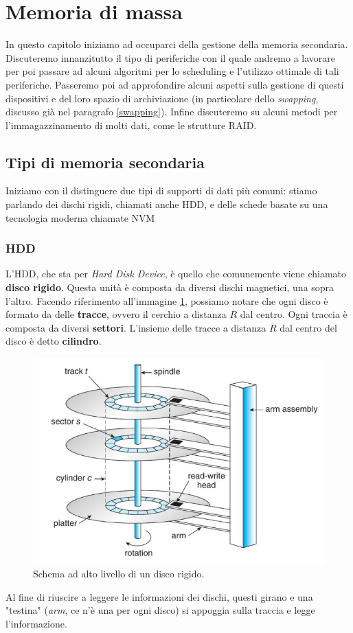 \section{Memoria di massa}\label{mass memory}
In questo capitolo iniziamo ad occuparci della gestione della memoria secondaria. Discuteremo innanzitutto il tipo di periferiche con il quale andremo a lavorare per poi passare ad alcuni algoritmi per lo scheduling e l'utilizzo ottimale di tali periferiche. Passeremo poi ad approfondire alcuni aspetti sulla gestione di questi dispositivi e del loro spazio di archiviazione (in particolare dello \textit{swapping}, discusso già nel paragrafo \ref{swapping}). Infine discuteremo su alcuni metodi per l'immagazzinamento di molti dati, come le strutture RAID.

\subsection{Tipi di memoria secondaria}
Iniziamo con il distinguere due tipi di supporti di dati più comuni: stiamo parlando dei dischi rigidi, chiamati anche HDD, e delle schede basate su una tecnologia moderna chiamate NVM

\subsubsection{HDD}\label{seek}
L'HDD, che sta per \textit{Hard Disk Device}, è quello che comunemente viene chiamato \textbf{disco rigido}. Questa unità è composta da diversi dischi magnetici, una sopra l'altro. Facendo riferimento all'immagine \ref{fig:HDD}, possiamo notare che ogni disco è formato da delle \textbf{tracce}, ovvero il cerchio a distanza $\overline{R}$ dal centro. Ogni traccia è composta da diversi \textbf{settori}. L'insieme delle tracce a distanza $\overline{R}$ dal centro del disco è detto \textbf{cilindro}.
\begin{figure}[h]
    \centering
    \includegraphics[width = .6\textwidth]{../res/imgs/mass memory/HDD.png}
    \caption{Schema ad alto livello di un disco rigido.}
    \label{fig:HDD}
\end{figure}
Al fine di riuscire a leggere le informazioni dei dischi, questi girano e una "testina" (\textit{arm}, ce n'è una per ogni disco) si appoggia sulla traccia e legge l'informazione.


